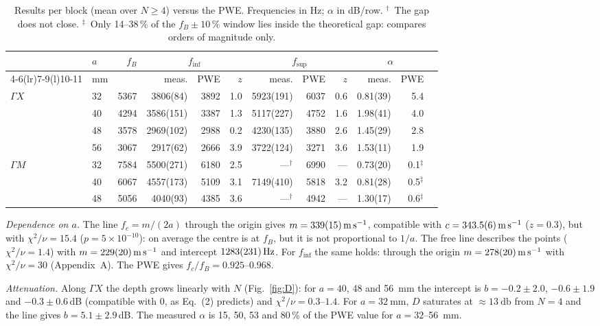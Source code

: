 \documentclass[9pt,a4paper,twocolumn]{extarticle}
\newcommand{\umm}{\milli\metre}
\newcommand{\uHz}{\hertz}
\newcommand{\udB}{\decibel}
\newcommand{\ums}{\metre\per\second}
\newcommand{\GX}{\ensuremath{\Gamma X}}
\newcommand{\GM}{\ensuremath{\Gamma M}}
\newcommand{\finf}{\ensuremath{f_{\mathrm{inf}}}}
\newcommand{\fsup}{\ensuremath{f_{\mathrm{sup}}}}
\begin{document}
\begin{table}[t]
\centering
\caption{Results per block (mean over $N\ge4$) versus the PWE. Frequencies in Hz; $\alpha$ in dB/row. $^\dagger$~The gap does not close. $^\ddagger$~Only 14--38\,\% of the $f_B\pm10\,\%$ window lies inside the theoretical gap: compares orders of magnitude only.}
\label{tab:main}
\scriptsize
\setlength{\tabcolsep}{2.6pt}
\begin{tabular}{@{}llrrrrrrrrrr@{}}
\toprule
 & $a$ & $f_B$ & \multicolumn{3}{c}{\finf} & \multicolumn{3}{c}{\fsup} & \multicolumn{2}{c}{$\alpha$}\\
 \cmidrule(lr){4-6}\cmidrule(lr){7-9}\cmidrule(l){10-11}
 & mm & & meas. & PWE & $z$ & meas. & PWE & $z$ & meas. & PWE\\
\midrule
\GX & 32 & 5367 & 3806(84) & 3892 & 1.0 & 5923(191) & 6037 & 0.6 & 0.81(39) & 5.4\\
    & 40 & 4294 & 3586(151) & 3387 & 1.3 & 5117(227) & 4752 & 1.6 & 1.98(41) & 4.0\\
    & 48 & 3578 & 2969(102) & 2988 & 0.2 & 4230(135) & 3880 & 2.6 & 1.45(29) & 2.8\\
    & 56 & 3067 & 2917(62)  & 2666 & 3.9 & 3722(124) & 3271 & 3.6 & 1.53(11) & 1.9\\
\midrule
\GM & 32 & 7584 & 5500(271) & 6180 & 2.5 & ---$^\dagger$ & 6990 & --- & 0.73(20) & 0.1$^\ddagger$\\
    & 40 & 6067 & 4557(173) & 5109 & 3.1 & 7149(410) & 5818 & 3.2 & 0.81(28) & 0.5$^\ddagger$\\
    & 48 & 5056 & 4040(93)  & 4385 & 3.6 & ---$^\dagger$ & 4942 & --- & 1.30(17) & 0.6$^\ddagger$\\
\bottomrule
\end{tabular}
\end{table}

\emph{Dependence on $a$.} The line $f_c=m/(2a)$ through the origin gives $m=\SI{339\pm15}{\ums}$, compatible with $c=\SI{343.5\pm0.6}{\ums}$ ($z=0.3$), but with $\chi^2/\nu=15.4$ ($p=5\times10^{-10}$): on average the centre is at $f_B$, but it is not proportional to $1/a$. The free line describes the points ($\chi^2/\nu=1.4$) with $m=\SI{229\pm20}{\ums}$ and intercept $\SI{1283\pm231}{\uHz}$. For \finf{} the same holds: through the origin $m=\SI{278\pm20}{\ums}$ with $\chi^2/\nu=30$ (Appendix~A). The PWE gives $f_c/f_B=0.925$--$0.968$.

\emph{Attenuation.} Along \GX{} the depth grows linearly with $N$ (Fig.~\ref{fig:D}): for $a=40$, 48 and \SI{56}{\umm} the intercept is $b=-0.2\pm2.0$, $-0.6\pm1.9$ and $-0.3\pm0.6$\,dB (compatible with 0, as Eq.~(2) predicts) and $\chi^2/\nu=0.3$--$1.4$. For $a=\SI{32}{\umm}$, $D$ saturates at $\approx\SI{13}{\udB}$ from $N=4$ and the line gives $b=5.1\pm2.9$\,dB. The measured $\alpha$ is 15, 50, 53 and 80\,\% of the PWE value for $a=32$--\SI{56}{\umm}.
\end{document}
